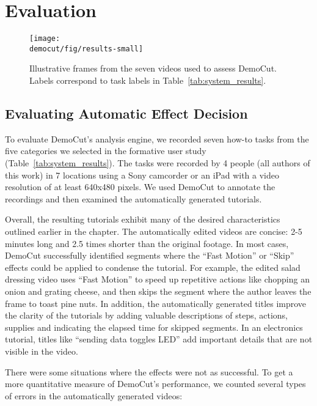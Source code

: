 \section{Evaluation}

\begin{figure}[t]
  \centering
  \texttt{[image: \\democut/fig/results-small]}
  \caption{Illustrative frames from the seven videos used to assess DemoCut. Labels correspond to task labels in Table~\ref{tab:system_results}.}
  \label{fig:results}
  \vspace{-0.2in}
\end{figure}

\subsection{Evaluating Automatic Effect Decision}

To evaluate DemoCut's analysis engine, we recorded seven how-to tasks
from the five categories we selected in the formative user study
(Table~\ref{tab:system_results}).
%
The tasks were recorded by 4 people (all authors of this
work) in 7 locations using a Sony camcorder or an iPad with
a video resolution of at least 640x480 pixels.
%
We used DemoCut to annotate the recordings and then examined the
automatically generated tutorials.

Overall, the resulting tutorials exhibit many of the desired
characteristics outlined earlier in the chapter.
%
The automatically edited videos are concise: 2-5 minutes long and 2.5
times shorter than the original footage.
%
In most cases, DemoCut successfully identified segments where the ``Fast
Motion'' or ``Skip'' effects could be applied to condense the tutorial.
%
For example, the edited salad dressing video uses ``Fast Motion'' to
speed up repetitive actions like chopping an onion and grating cheese,
and then skips the segment where the author leaves the frame to toast
pine nuts.
%
In addition, the automatically generated titles improve the clarity of
the tutorials by adding valuable descriptions of steps, actions,
supplies and indicating the elapsed time for skipped segments.
%
In an electronics tutorial, titles like ``sending data toggles LED''
add important details that are not visible in the video.

There were some situations where the effects were not as successful.
%
To get a more quantitative measure of DemoCut's performance, we
counted several types of errors in the automatically generated
videos:

